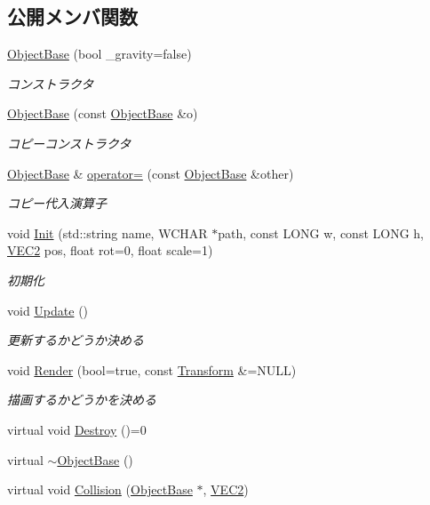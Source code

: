 \subsection*{公開メンバ関数}
\begin{DoxyCompactItemize}
\item 
\mbox{\hyperlink{class_object_base_a8567572c8f524465f9c70cabdb603637}{Object\+Base}} (bool \+\_\+gravity=false)
\begin{DoxyCompactList}\small\item\em コンストラクタ \end{DoxyCompactList}\item 
\mbox{\hyperlink{class_object_base_a5f5bbcf3e9036ac77a93c2243999f534}{Object\+Base}} (const \mbox{\hyperlink{class_object_base}{Object\+Base}} \&o)
\begin{DoxyCompactList}\small\item\em コピーコンストラクタ \end{DoxyCompactList}\item 
\mbox{\hyperlink{class_object_base}{Object\+Base}} \& \mbox{\hyperlink{class_object_base_aa475bbf5768adfb410951251f0070d19}{operator=}} (const \mbox{\hyperlink{class_object_base}{Object\+Base}} \&other)
\begin{DoxyCompactList}\small\item\em コピー代入演算子 \end{DoxyCompactList}\item 
void \mbox{\hyperlink{class_object_base_a65028dd02e59f53f441e3dcccaf301e9}{Init}} (std\+::string name, W\+C\+H\+AR $\ast$path, const L\+O\+NG w, const L\+O\+NG h, \mbox{\hyperlink{common_8h_afb0c5e21d4133ff4f200992c0b534e1b}{V\+E\+C2}} pos, float rot=0, float scale=1)
\begin{DoxyCompactList}\small\item\em 初期化 \end{DoxyCompactList}\item 
void \mbox{\hyperlink{class_object_base_a5b5672034139b22235ada326eb16dd3e}{Update}} ()
\begin{DoxyCompactList}\small\item\em 更新するかどうか決める \end{DoxyCompactList}\item 
void \mbox{\hyperlink{class_object_base_ac84be5b56d23b8809ca08e27c0dcb16a}{Render}} (bool=true, const \mbox{\hyperlink{class_transform}{Transform}} \&=N\+U\+LL)
\begin{DoxyCompactList}\small\item\em 描画するかどうかを決める \end{DoxyCompactList}\item 
virtual void \mbox{\hyperlink{class_object_base_a7fa4c548153c3af20f89673ffea809af}{Destroy}} ()=0
\item 
virtual \mbox{\hyperlink{class_object_base_a7074bc9389069351c2d0eee6a47e5ee3}{$\sim$\+Object\+Base}} ()
\item 
virtual void \mbox{\hyperlink{class_object_base_ad772d7a42f5e46c39481f5db22ee8193}{Collision}} (\mbox{\hyperlink{class_object_base}{Object\+Base}} $\ast$, \mbox{\hyperlink{common_8h_afb0c5e21d4133ff4f200992c0b534e1b}{V\+E\+C2}})
\end{DoxyCompactItemize}
